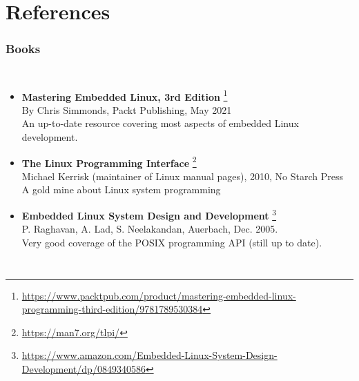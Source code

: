 \section{References}

\begin{frame}
  \frametitle{Books}
  \begin{columns}
    \small
    \begin{itemize}
    \item {\bf Mastering Embedded Linux, 3rd Edition}
      \footnote{\tiny
\url{https://www.packtpub.com/product/mastering-embedded-linux-programming-third-edition/9781789530384}}\\
      By Chris Simmonds, Packt Publishing, May 2021\\
      An up-to-date resource covering most aspects of embedded Linux
      development.
    \item {\bf The Linux Programming Interface}
      \footnote{\tiny \url{https://man7.org/tlpi/}}\\
      Michael Kerrisk (maintainer of Linux manual pages), 2010, No Starch Press\\
      A gold mine about Linux system programming\\
    \item {\bf Embedded Linux System Design and Development}
      \footnote{\tiny \url{https://www.amazon.com/Embedded-Linux-System-Design-Development/dp/0849340586}}\\
      P. Raghavan, A. Lad, S. Neelakandan, Auerbach, Dec. 2005.\\
      Very good coverage of the POSIX programming API (still up
      to date).
    \end{itemize}
    \normalsize

\end{columns}
\end{frame}
